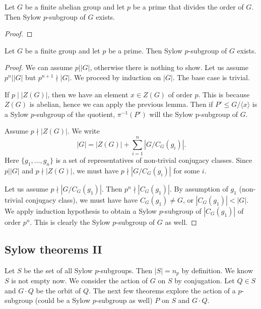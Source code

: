 \begin{cor}
    Let $G$ be a finite abelian group and let $p$ be a prime that divides the order of $G$. Then Sylow $p$-subgroup of $G$ exists.
\end{cor}

\begin{proof}

\end{proof}
\begin{thm}
    Let $G$ be a finite group and let $p$ be a prime. Then Sylow $p$-subgroup of $G$ exists.
\end{thm}
\begin{proof}
    We can assume $p \vert |G|$, otherwise there is nothing to show. Let us assume $p^n \vert |G|$ but $p^{n+1} \nmid |G|$.
    We proceed by induction on $|G|$. The base case is trivial.

    If $p \mid |Z(G)|$, then we have an element $x \in Z(G)$ of order $p$. This is because $Z(G)$ is abelian, hence we can apply the previous lemma. Then if $P' \le G/\langle x \rangle$ is a Sylow $p$-subgroup of the quotient, $\pi^{-1}(P')$ will the Sylow p-subgroup of $G$.

    Assume $p \nmid |Z(G)|$. We write
    \[
        |G| = |Z(G)| + \sum_{i =1}^n |G/C_G(g_i)|.
    \]
    Here $\{g_1, \dots, g_n\}$ is a set of representatives of non-trivial conjugacy classes. Since $p \vert |G|$ and $p \nmid |Z(G)|$, we must have $p \nmid |G/C_G(g_i)|$ for some $i$.

    Let us assume $p \nmid |G/C_G(g_1)|$. Then $p^n \nmid |C_G(g_1)|$. By assumption of $g_1$ (non-trivial conjugacy class), we must have have $C_G(g_1) \neq G$, or $|C_G(g_1)| < |G|$. We apply induction hypothesis to obtain a Sylow $p$-subgroup of $|C_G(g_1)| $ of order $p^n$. This is clearly the Sylow $p$-subgroup of $G$ as well.
\end{proof}




\subsection{Sylow theorems II}

Let $S$ be the set of all Sylow $p$-subgroups. Then $|S| = n_p$ by definition. We know $S$ is not empty now. We consider the action of $G$ on $S$ by conjugation. Let $Q \in S$ and $G\cdot Q$ be the orbit of $Q$. The next few theorems explore the action of a $p$-subgroup (could be a Sylow $p$-subgroup as well) $P$ on $S$ and $G\cdot Q$.

